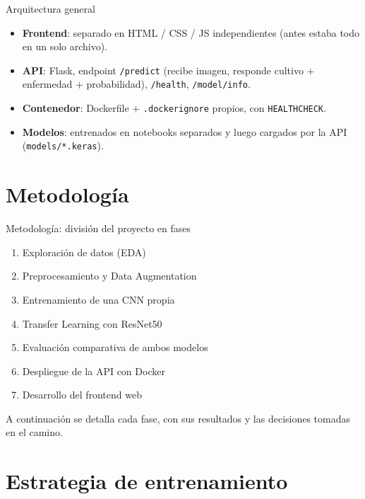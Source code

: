 \documentclass[aspectratio=169]{beamer}
\begin{document}
\begin{frame}{Arquitectura general}
  \begin{itemize}
    \item \textbf{Frontend}: separado en HTML / CSS / JS independientes (antes estaba todo en un solo archivo).
    \item \textbf{API}: Flask, endpoint \texttt{/predict} (recibe imagen, responde cultivo + enfermedad + probabilidad), \texttt{/health}, \texttt{/model/info}.
    \item \textbf{Contenedor}: Dockerfile + \texttt{.dockerignore} propios, con \texttt{HEALTHCHECK}.
    \item \textbf{Modelos}: entrenados en notebooks separados y luego cargados por la API (\texttt{models/*.keras}).
  \end{itemize}
\end{frame}

\section{Metodología}

\begin{frame}{Metodología: división del proyecto en fases}
  \begin{enumerate}
    \item Exploración de datos (EDA)
    \item Preprocesamiento y Data Augmentation
    \item Entrenamiento de una CNN propia
    \item Transfer Learning con ResNet50
    \item Evaluación comparativa de ambos modelos
    \item Despliegue de la API con Docker
    \item Desarrollo del frontend web
  \end{enumerate}
  \vspace{0.2cm}
  \footnotesize A continuación se detalla cada fase, con sus resultados y las decisiones tomadas en el camino.
\end{frame}

\section{Estrategia de entrenamiento}
\end{document}
